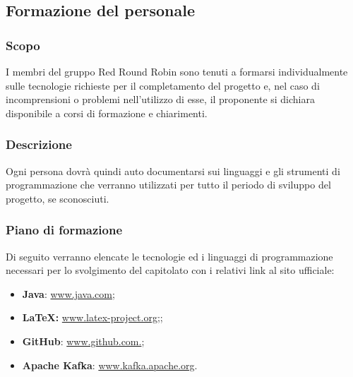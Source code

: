 \subsection{Formazione del personale}

	\subsubsection{Scopo}
		I membri del gruppo Red Round Robin sono tenuti a formarsi individualmente sulle tecnologie richieste per il completamento del progetto e, nel caso di incomprensioni o problemi nell'utilizzo di esse, il proponente si dichiara disponibile a corsi di formazione e chiarimenti.
		
	\subsubsection{Descrizione}
		Ogni persona dovrà quindi auto documentarsi sui linguaggi e gli strumenti di programmazione che verranno utilizzati per tutto il periodo di sviluppo del progetto, se sconosciuti.
		
	\subsubsection{Piano di formazione}
		Di seguito verranno elencate le tecnologie ed i linguaggi di programmazione necessari per lo svolgimento del capitolato con i relativi link al sito ufficiale:
		\begin{itemize}
			\item \textbf{Java}: \href{https://www.java.com/}{www.java.com};
			\item \textbf{\LaTeX{}:} \href{www.latex-project.org}{www.latex-project.org;};
			\item \textbf{GitHub}: \href{www.github.com}{www.github.com.};
			\item \textbf{Apache Kafka}: \href{https://kafka.apache.org/}{www.kafka.apache.org}.
		\end{itemize}

